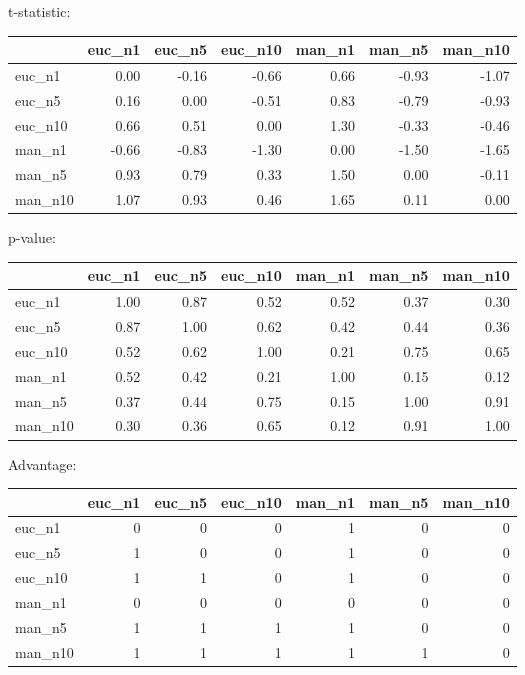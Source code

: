 t-statistic:
 \begin{tabular}{lrrrrrr}
\hline
         &   euc\_n1 &   euc\_n5 &   euc\_n10 &   man\_n1 &   man\_n5 &   man\_n10 \\
\hline
 euc\_n1  &     0.00 &    -0.16 &     -0.66 &     0.66 &    -0.93 &     -1.07 \\
 euc\_n5  &     0.16 &     0.00 &     -0.51 &     0.83 &    -0.79 &     -0.93 \\
 euc\_n10 &     0.66 &     0.51 &      0.00 &     1.30 &    -0.33 &     -0.46 \\
 man\_n1  &    -0.66 &    -0.83 &     -1.30 &     0.00 &    -1.50 &     -1.65 \\
 man\_n5  &     0.93 &     0.79 &      0.33 &     1.50 &     0.00 &     -0.11 \\
 man\_n10 &     1.07 &     0.93 &      0.46 &     1.65 &     0.11 &      0.00 \\
\hline
\end{tabular} 

p-value:
 \begin{tabular}{lrrrrrr}
\hline
         &   euc\_n1 &   euc\_n5 &   euc\_n10 &   man\_n1 &   man\_n5 &   man\_n10 \\
\hline
 euc\_n1  &     1.00 &     0.87 &      0.52 &     0.52 &     0.37 &      0.30 \\
 euc\_n5  &     0.87 &     1.00 &      0.62 &     0.42 &     0.44 &      0.36 \\
 euc\_n10 &     0.52 &     0.62 &      1.00 &     0.21 &     0.75 &      0.65 \\
 man\_n1  &     0.52 &     0.42 &      0.21 &     1.00 &     0.15 &      0.12 \\
 man\_n5  &     0.37 &     0.44 &      0.75 &     0.15 &     1.00 &      0.91 \\
 man\_n10 &     0.30 &     0.36 &      0.65 &     0.12 &     0.91 &      1.00 \\
\hline
\end{tabular} 

Advantage:
 \begin{tabular}{lrrrrrr}
\hline
         &   euc\_n1 &   euc\_n5 &   euc\_n10 &   man\_n1 &   man\_n5 &   man\_n10 \\
\hline
 euc\_n1  &        0 &        0 &         0 &        1 &        0 &         0 \\
 euc\_n5  &        1 &        0 &         0 &        1 &        0 &         0 \\
 euc\_n10 &        1 &        1 &         0 &        1 &        0 &         0 \\
 man\_n1  &        0 &        0 &         0 &        0 &        0 &         0 \\
 man\_n5  &        1 &        1 &         1 &        1 &        0 &         0 \\
 man\_n10 &        1 &        1 &         1 &        1 &        1 &         0 \\
\hline
\end{tabular} 

